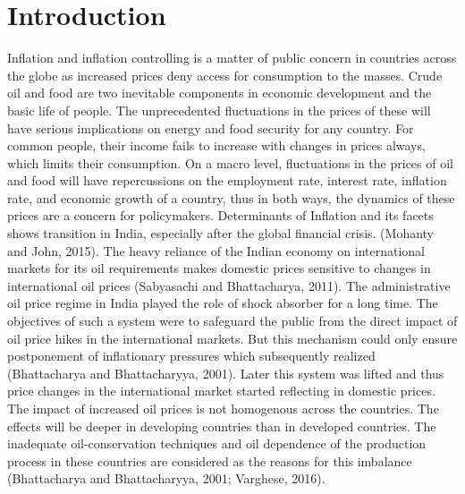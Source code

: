 \documentclass[a4paper,12pt]{article}
\begin{document}
\section{Introduction}
\onehalfspacing
Inflation and inflation controlling is a matter of public concern in countries across the globe as increased prices deny access for consumption to the masses. Crude oil and food are two inevitable components in economic development and the basic life of people. The unprecedented fluctuations in the prices of these will have serious implications on energy and food security for any country. For common people, their income fails to increase with changes in prices always, which limits their consumption. On a macro level, fluctuations in the prices of oil and food will have repercussions on the employment rate, interest rate, inflation rate, and economic growth of a country, thus in both ways, the dynamics of these prices are a concern for policymakers. Determinants of Inflation and its facets shows transition in India, especially after the global financial crisis. (Mohanty and John, 2015). The heavy reliance of the Indian economy on international markets for its oil requirements makes domestic prices sensitive to changes in international oil prices (Sabyasachi and Bhattacharya, 2011). The administrative oil price regime in India played the role of shock absorber for a long time. The objectives of such a system were to safeguard the public from the direct impact of oil price hikes in the international markets. But this mechanism could only ensure postponement of inflationary pressures which subsequently realized (Bhattacharya and Bhattacharyya, 2001). Later this system was lifted and thus price changes in the international market started reflecting in domestic prices. The impact of increased oil prices is not homogenous across the countries. The effects will be deeper in developing countries than in developed countries. The inadequate oil-conservation techniques and oil dependence of the production process in these countries are considered as the reasons for this imbalance (Bhattacharya and Bhattacharyya, 2001; Varghese, 2016).
\end{document}
